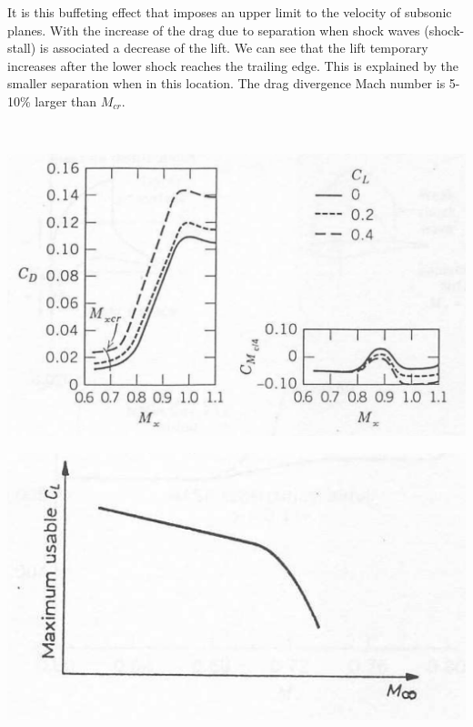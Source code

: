 	It is this buffeting effect that imposes an upper limit to the velocity of subsonic planes. With the increase of the drag due to separation when shock waves (shock-stall) is associated a decrease of the lift. We can see that the lift temporary increases after the lower shock reaches the trailing edge. This is explained by the smaller separation when in this location. The drag divergence Mach number is 5-10\% larger than $M_{cr}$. 
	
	\ \\
	
	\begin{center}
	\begin{minipage}{0.4\textwidth}
	\includegraphics[scale=0.15]{ch6/5}
	\label{fig:6.5}
	\end{minipage}
	\begin{minipage}{0.4\textwidth}
	\includegraphics[scale=0.4]{ch6/6}
	\label{fig:6.6}
	\end{minipage}
	\end{center}

